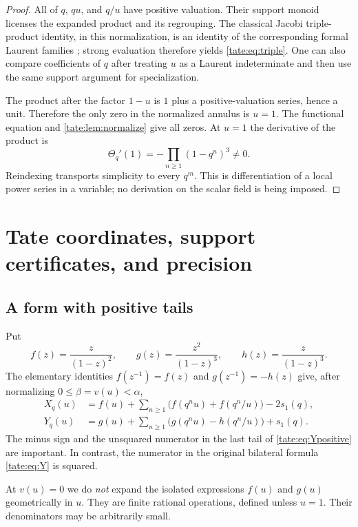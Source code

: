 \documentclass[11pt,letterpaper]{article}
\theoremstyle{definition}
\begin{document}
\begin{proof}
All of $q$, $qu$, and $q/u$ have positive valuation. Their support monoid
licenses the expanded product and its regrouping. The classical Jacobi
triple-product identity, in this normalization, is an identity of the
corresponding formal Laurent families \cite{DLMF}; strong evaluation
therefore yields \eqref{tate:eq:triple}. One can also compare coefficients of
$q$ after treating $u$ as a Laurent indeterminate and then use the same
support argument for specialization.

The product after the factor $1-u$ is $1$ plus a positive-valuation
series, hence a unit. Therefore the only zero in the normalized annulus
is $u=1$. The functional equation and \cref{tate:lem:normalize} give all
zeros. At $u=1$ the derivative of the product is
\[
 \Theta_q'(1)=-\prod_{n\ge1}(1-q^n)^3\ne0.
\]
Reindexing transports simplicity to every $q^m$. This is differentiation
of a local power series in a variable; no derivation on the scalar field
is being imposed.
\end{proof}

\section{Tate coordinates, support certificates, and precision}\label{tate:sec:coordinates}

\subsection{A form with positive tails}

Put
\[
 f(z)=\frac{z}{(1-z)^2},\qquad
 g(z)=\frac{z^2}{(1-z)^3},\qquad
 h(z)=\frac{z}{(1-z)^3}.
\]
The elementary identities $f(z^{-1})=f(z)$ and
$g(z^{-1})=-h(z)$ give, after normalizing $0\le\beta=v(u)<\alpha$,
\begin{align}
 X_q(u)&=f(u)+\sum_{n\ge1}\bigl(f(q^nu)+f(q^n/u)\bigr)-2s_1(q),
       \label{tate:eq:Xpositive}\\
 Y_q(u)&=g(u)+\sum_{n\ge1}\bigl(g(q^nu)-h(q^n/u)\bigr)+s_1(q).
       \label{tate:eq:Ypositive}
\end{align}
The minus sign and the unsquared numerator in the last tail of
\eqref{tate:eq:Ypositive} are important. In contrast, the numerator in the
original bilateral formula \eqref{tate:eq:Y} is squared.

At $v(u)=0$ we do \emph{not} expand the isolated expressions $f(u)$ and
$g(u)$ geometrically in $u$. They are finite rational operations, defined
unless $u=1$. Their denominators may be arbitrarily small.
\end{document}
